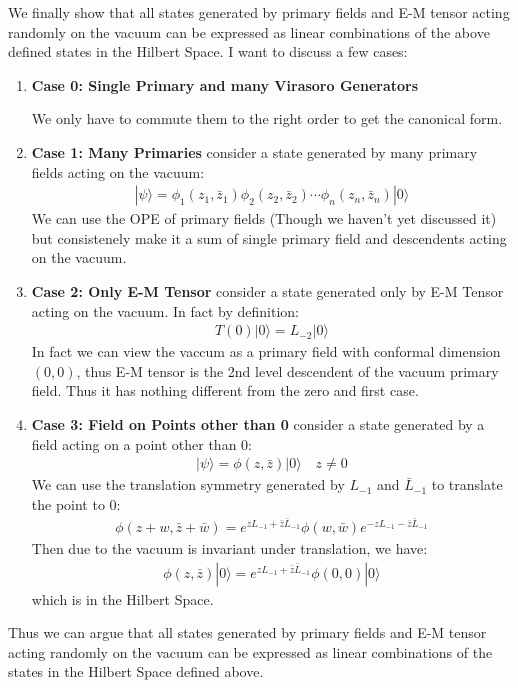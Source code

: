 We finally show that all states generated by primary fields and E-M
tensor acting randomly on the vacuum can be expressed as linear
combinations of the above defined states in the Hilbert Space. I want
to discuss a few cases:
\begin{enumerate}
  \item \textbf{Case 0: Single Primary and many Virasoro Generators}

    We only have to commute them to the right order to get the canonical form.
  \item \textbf{Case 1: Many Primaries} consider a state generated by
    many primary fields acting on the vacuum:
    \begin{align}
      |\psi\rangle=\phi_1(z_1,\bar{z}_1)\phi_2(z_2,\bar{z}_2)\cdots\phi_n(z_n,\bar{z}_n)|0\rangle
    \end{align}
    We can use the OPE of primary fields (Though we haven't yet
    discussed it) but consistenely make it a sum of single primary
    field and descendents acting on the vacuum.
  \item \textbf{Case 2: Only E-M Tensor} consider a state generated
    only by E-M Tensor acting on the vacuum. In fact by definition:
    \begin{align}
      T(0)|0\rangle = L_{-2}|0\rangle
    \end{align}
    In fact we can view the vaccum as a primary field with conformal
    dimension $ (0,0) $, thus E-M tensor is the 2nd level descendent
    of the vacuum primary field. Thus it has nothing different from
    the zero and first case.
  \item \textbf{Case 3: Field on Points other than 0} consider a
    state generated by a field acting on a point other than 0:
    \begin{align}
      |\psi\rangle=\phi(z,\bar{z})|0\rangle\quad z\neq 0
    \end{align}
    We can use the translation symmetry generated by $ L_{-1} $ and $
    \bar{L}_{-1} $ to translate the point to 0:
    \begin{align}
      \phi(z+w,\bar{z}+\bar{w})=e^{zL_{-1}+\bar{z}\bar{L}_{-1}}\phi(w,\bar{w})e^{-zL_{-1}-\bar{z}\bar{L}_{-1}}
    \end{align}
    Then due to the vacuum is invariant under translation, we have:
    \begin{align}
      \phi(z,\bar{z})|0\rangle=e^{zL_{-1}+\bar{z}\bar{L}_{-1}}\phi(0,0)|0\rangle
    \end{align}
    which is in the Hilbert Space.
\end{enumerate}
Thus we can argue that all states generated by primary fields and E-M
tensor acting randomly on the vacuum can be expressed as linear
combinations of the states in the Hilbert Space defined above.

